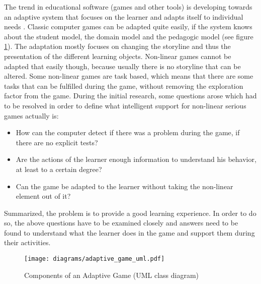 The trend in educational software (games and other tools) is developing towards an
adaptive system that focuses on the learner and adapts itself to
individual needs \cite{Shute2003b}. Classic computer games can be adapted quite
easily, if the system knows about the student model, the domain model and the
pedagogic model (see figure \ref{adaptive_game}). The adaptation mostly focuses on
changing the storyline and thus the presentation of the different learning
objects. Non-linear games cannot be adapted that easily though, because usually
there is no storyline that can be altered. Some non-linear games are task
based, which means that there are some tasks that can be fulfilled during the game,
without removing the exploration factor from the game. During the initial
research, some questions arose which had to be resolved in order to define what
intelligent support for non-linear serious games actually is:
\begin{itemize}
\item How can the computer detect if there was a problem during the game, if there
are no explicit tests?
\item Are the actions of the learner enough information to understand his
behavior, at least to a certain degree?
\item Can the game be adapted to the learner without taking the non-linear
element out of it? 
\end{itemize}
Summarized, the problem is to provide a good learning experience. In order to
do so, the above questions have to be examined closely and answers need to be
found to understand what the learner does in the game and support them
during their activities.

\begin{figure}
    \centering
    \texttt{[image: diagrams/adaptive\_game\_uml.pdf]}
    \caption[Components of an Adaptive Game (UML class diagram)]
    {Components of an Adaptive Game (UML class diagram)}
    \label{adaptive_game}
\end{figure}


